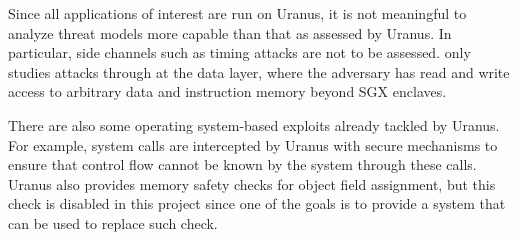 Since all applications of interest are run on Uranus,
it is not meaningful to analyze threat models more capable than that as assessed by Uranus.
In particular, side channels such as timing attacks are not to be assessed.
\pname{} only studies attacks through at the data layer,
where the adversary has read and write access
to arbitrary data and instruction memory beyond \ac{SGX} enclaves.

There are also some operating system-based exploits already tackled by Uranus.
For example, system calls are intercepted by Uranus with secure mechanisms
to ensure that control flow cannot be known by the system through these calls.
Uranus also provides memory safety checks for object field assignment,
but this check is disabled in this project
since one of the goals is to provide a system that can be used to replace such check.
